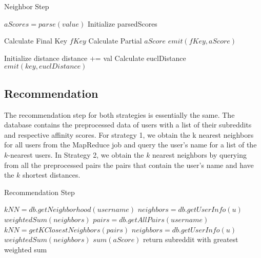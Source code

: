 \documentclass[conference, 12pt]{IEEEtran}
\begin{document}
\begin{algorithm}[!h]
	\small
	\caption{Neighbor Step}
	\label{algo:neighbor_step}
	\begin{algorithmic}[1]
			\State $aScores = parse(value)$
			\State Initialize parsedScores
			 
				\State Calculate Final Key $fKey$
				\State Calculate Partial $aScore$
				\State $emit(fKey, aScore)$
			\EndFor
			 
		\EndFunction
			\State Initialize distance
				 distance += val
			\EndFor
			 \State Calculate euclDistance
			\State $emit(key, euclDistance)$
		\EndFunction
	\end{algorithmic}
\end{algorithm}
\subsection{Recommendation}

The recommendation step for both strategies is essentially the same.  The database contains the preprocessed data of users with a list of their subreddits and respective affinity scores.  For strategy 1, we obtain the k nearest neighbors for all users from the MapReduce job and query the user’s name for a list of the $k$-nearest users.  In Strategy 2, we obtain the $k$ nearest neighbors by querying from all the preprocessed pairs the pairs that contain the user’s name and have the $k$ shortest distances.

\begin{algorithm}[!h]
	\small
	\caption{Recommendation Step}
	\label{algo:recommendation}
	\begin{algorithmic}[1]
			\State $ kNN = db.getNeighborhood(username)$
				\State $ neighbors = db.getUserInfo(u)$
			\EndFor
			\State $weightedSum(neighbors)$
		\EndFunction
			\State $ pairs = db.getAllPairs(username)$
			\State $ kNN = getKClosestNeighbors(pairs)$
				\State $ neighbors = db.getUserInfo(u)$
			\EndFor
			\State $weightedSum(neighbors)$
		\EndFunction
				\State $sum(aScore)$
			\EndFor
			\EndFor	
			\State return subreddit with greatest weighted sum
			\EndFunction
	\end{algorithmic}
\end{algorithm}
\end{document}
